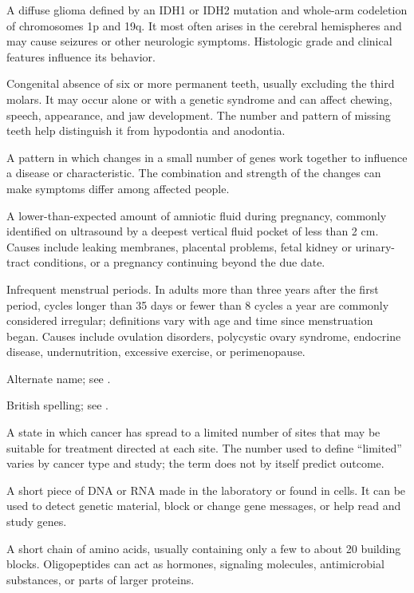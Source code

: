  A diffuse glioma defined by an IDH1 or IDH2 mutation and
whole-arm codeletion of chromosomes 1p and 19q. It most often arises in the cerebral
hemispheres and may cause seizures or other neurologic symptoms. Histologic grade
and clinical features influence its behavior.

 Congenital absence of six or more permanent teeth, usually
excluding the third molars. It may occur alone or with a genetic syndrome and can
affect chewing, speech, appearance, and jaw development. The number and pattern of
missing teeth help distinguish it from hypodontia and anodontia.

 A pattern in which changes in a small number of genes work together to influence a disease or characteristic. The combination and strength of the changes can make symptoms differ among affected people.

 A lower-than-expected amount of amniotic fluid during pregnancy, commonly identified on ultrasound by a deepest vertical fluid pocket of less than 2 cm. Causes include leaking membranes, placental problems, fetal kidney or urinary-tract conditions, or a pregnancy continuing beyond the due date.

 Infrequent menstrual periods. In adults more than three years after the first period, cycles longer than 35 days or fewer than 8 cycles a year are commonly considered irregular; definitions vary with age and time since menstruation began. Causes include ovulation disorders, polycystic ovary syndrome, endocrine disease, undernutrition, excessive exercise, or perimenopause.

 Alternate name; see .

 British spelling; see .

 A state in which cancer has spread to a limited number of sites that may be suitable for treatment directed at each site. The number used to define “limited” varies by cancer type and study; the term does not by itself predict outcome.

 A short piece of DNA or RNA made in the laboratory or found in cells. It can be used to detect genetic material, block or change gene messages, or help read and study genes.

 A short chain of amino acids, usually containing only a few to about 20 building blocks. Oligopeptides can act as hormones, signaling molecules, antimicrobial substances, or parts of larger proteins.

